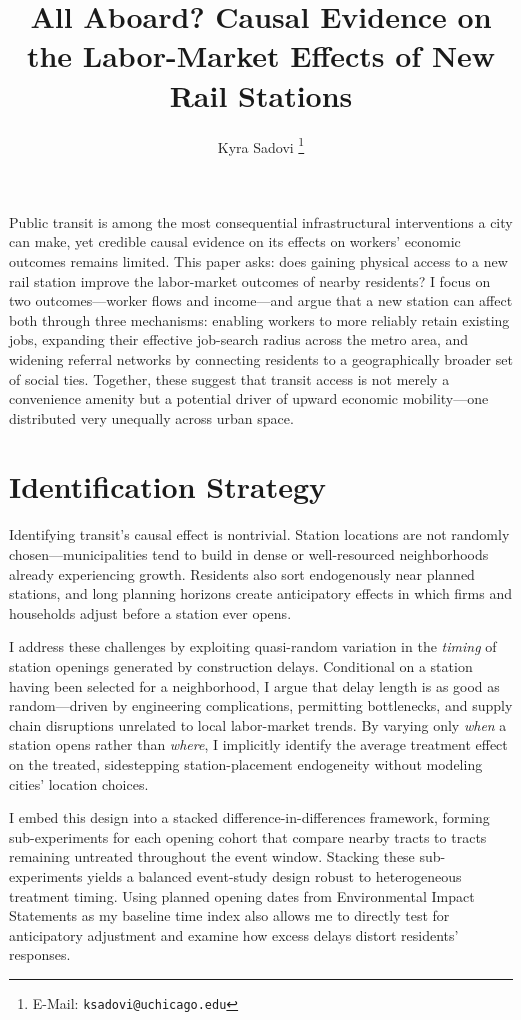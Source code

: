 \documentclass[12pt]{article}
\title{\textbf{All Aboard? Causal Evidence on the Labor-Market Effects of New Rail Stations}}
\author{Kyra Sadovi%
  \thanks{E-Mail: \texttt{ksadovi@uchicago.edu}}}
\affil{Harris School of Public Policy, University of Chicago}
\date{}
\begin{document}
\maketitle
\thispagestyle{empty}
 
Public transit is among the most consequential infrastructural interventions a city can make, yet credible causal evidence on its effects on workers' economic outcomes remains limited. This paper asks: does gaining physical access to a new rail station improve the labor-market outcomes of nearby residents? I focus on two outcomes---worker flows and income---and argue that a new station can affect both through three mechanisms: enabling workers to more reliably retain existing jobs, expanding their effective job-search radius across the metro area, and widening referral networks by connecting residents to a geographically broader set of social ties. Together, these suggest that transit access is not merely a convenience amenity but a potential driver of upward economic mobility---one distributed very unequally across urban space.
 
\section{Identification Strategy}
 
Identifying transit's causal effect is nontrivial. Station locations are not randomly chosen---municipalities tend to build in dense or well-resourced neighborhoods already experiencing growth. Residents also sort endogenously near planned stations, and long planning horizons create anticipatory effects in which firms and households adjust before a station ever opens.
 
I address these challenges by exploiting quasi-random variation in the \textit{timing} of station openings generated by construction delays. Conditional on a station having been selected for a neighborhood, I argue that delay length is as good as random---driven by engineering complications, permitting bottlenecks, and supply chain disruptions unrelated to local labor-market trends. By varying only \textit{when} a station opens rather than \textit{where}, I implicitly identify the average treatment effect on the treated, sidestepping station-placement endogeneity without modeling cities' location choices.
 
I embed this design into a stacked difference-in-differences framework, forming sub-experiments for each opening cohort that compare nearby tracts to tracts remaining untreated throughout the event window. Stacking these sub-experiments yields a balanced event-study design robust to heterogeneous treatment timing. Using planned opening dates from Environmental Impact Statements as my baseline time index also allows me to directly test for anticipatory adjustment and examine how excess delays distort residents' responses.
 
\end{document}
